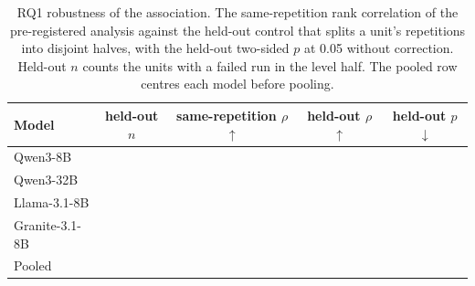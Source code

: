 \begin{table}[t]\centering
\caption{RQ1 robustness of the association. The same-repetition rank correlation of the pre-registered analysis against the held-out control that splits a unit's repetitions into disjoint halves, with the held-out two-sided $p$ at 0.05 without correction. Held-out $n$ counts the units with a failed run in the level half. The pooled row centres each model before pooling.}
\label{tab:rq1ho}
\begin{tabular}{lcccc}
\toprule
Model & held-out $n$ & same-repetition $\rho$ $\uparrow$ & held-out $\rho$ $\uparrow$ & held-out $p$ $\downarrow$ \\
\midrule
Qwen3-8B & \rqonehoQwenEightBN{} & \rqoneQwenEightBRho{} & \rqonehoQwenEightBRho{} & \rqonehoQwenEightBP{} \\
Qwen3-32B & \rqonehoQwenThirtyTwoBN{} & \rqoneQwenThirtyTwoBRho{} & \rqonehoQwenThirtyTwoBRho{} & \rqonehoQwenThirtyTwoBP{} \\
Llama-3.1-8B & \rqonehoLlamaN{} & \rqoneLlamaRho{} & \rqonehoLlamaRho{} & \rqonehoLlamaP{} \\
Granite-3.1-8B & \rqonehoGraniteN{} & \rqoneGraniteRho{} & \rqonehoGraniteRho{} & \rqonehoGraniteP{} \\
\midrule
Pooled & \rqonehoPooledN{} & \rqoneCentredRho{} & \rqonehoPooledRho{} & \rqonehoPooledP{} \\
\bottomrule
\end{tabular}
\end{table}

